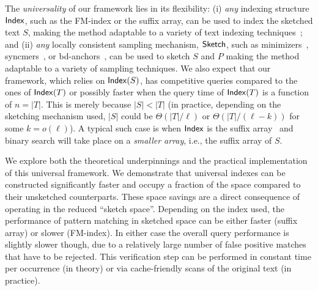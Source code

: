 The \textit{universality} of our framework lies in its flexibility: (i) \textit{any} indexing structure $\textup{\textsf{Index}}$, such as the FM-index or the suffix array, can be used to index the sketched text $S$, making the method adaptable to a variety of text indexing techniques~\cite{DBLP:journals/siamcomp/ManberM93,10.1145/1082036.1082039,grossi2005compressed,10.1145/3375890}; and (ii) \textit{any} locally consistent sampling mechanism, $\textup{\textsf{Sketch}}$, such as minimizers~\cite{DBLP:journals/bioinformatics/RobertsHHMY04,DBLP:conf/sigmod/SchleimerWA03}, syncmers~\cite{Syncmers}, or bd-anchors~\cite{DBLP:journals/tkde/LoukidesPS23},
can be used to sketch $S$ and $P$ making the method adaptable to a variety of sampling techniques.
We also expect that our framework, which relies on $\textup{\textsf{Index}}(S)$, has competitive queries compared to the ones of $\textup{\textsf{Index}}(T)$ or possibly faster when the query time of $\textup{\textsf{Index}}(T)$ is a function of $n=|T|$. This is merely because $|S|<|T|$ (in practice, depending on the sketching mechanism used, $|S|$ could be $\Theta(|T|/\ell)$ or $\Theta(|T|/(\ell-k))$ for some $k=o(\ell)$). A typical such case is when $\textup{\textsf{Index}}$ is the suffix array~\cite{DBLP:journals/siamcomp/ManberM93} and binary search will take place on a \emph{smaller array}, i.e., the suffix array of $S$.

We explore both the theoretical underpinnings and the practical implementation
of this universal framework.
We demonstrate that universal indexes can be constructed significantly faster
and occupy a fraction of the space compared to their unsketched counterparts.
These space savings are a direct consequence of operating in the reduced
``sketch space''. Depending on the index used, the performance of pattern
matching in sketched space can be either faster (suffix array) or slower
(FM-index). In either case the overall query performance is slightly slower
though, due to a relatively large number of false positive matches that have to
be rejected.
This verification step can be performed in constant time
per occurrence (in theory) or via cache-friendly scans of the original
text (in practice).

